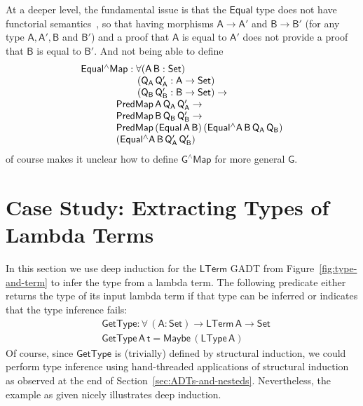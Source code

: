 \documentclass[sigplan,10pt,anonymous,review]{acmart}
\begin{document}
At a deeper level, the fundamental issue is that the $\mathsf{Equal}$
type does not have functorial semantics~\cite{jgj21}, so that having
morphisms $\mathsf{A \to A'}$ and $\mathsf{B \to B'}$ (for any type
$\mathsf{A, A', B}$ and $\mathsf{B'}$) and a proof that $\mathsf{A}$
is equal to $\mathsf{A'}$ does not provide a proof that $\mathsf{B}$
is equal to $\mathsf{B'}$. And not being able to define
\[\begin{array}{l}
\mathsf{Equal^\wedge Map : \forall (A\, B : Set)}\\
\hspace*{0.8in}\mathsf{(Q_A\, Q_A' : A \to Set)}\\
\hspace*{0.8in}\mathsf{(Q_B\, Q_B' : B \to Set) \to}\\
\hspace*{0.5in}\mathsf{PredMap\,A\,Q_A\,Q_A' \to}\\
\hspace*{0.5in}\mathsf{PredMap\,B\,Q_B\,Q_B' \to}\\
\hspace*{0.5in}\mathsf{PredMap\,(Equal\,A\,B)\,(Equal^\wedge
  A\,B\,Q_A\,Q_B)}\\
\hspace*{0.5in}\mathsf{(Equal^\wedge A\,B\,Q_A'\,Q_B')}
\end{array}\]
of course makes it unclear how to define $\mathsf{G^\wedge Map}$ for
more general $\mathsf{G}$.

\section{Case Study: Extracting Types of Lambda Terms}\label{sec:app}

In this section we use deep induction for the $\mathsf{LTerm}$ GADT
from Figure~\ref{fig:type-and-term} to infer the type from a lambda
term. The following predicate either returns the type of its input
lambda term if that type can be inferred or indicates that the type
inference fails:
\begin{align*}
  &\mathsf{GetType : \forall \, (A : Set) \to LTerm\,A \to Set} \\
  &\mathsf{GetType \,A \,t = Maybe \, (LType \, A)}
\end{align*}
Of course, since $\mathsf{GetType}$ is (trivially) defined by
structural induction, we could perform type inference using
hand-threaded applications of structural induction as observed at the
end of Section~\ref{sec:ADTs-and-nesteds}. Nevertheless, the example
as given nicely illustrates deep induction.
\end{document}
